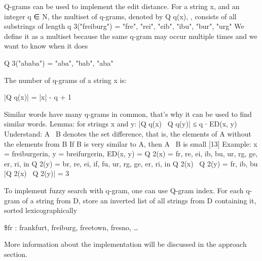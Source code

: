 Q-grams can be used to implement the edit distance. For a string x, and an integer q ∈ N, the multiset of q-grams, denoted by Q q(x), , consists of all substrings of length q 3("freiburg") = { "fre", "rei", "eib", "ibu", "bur", "urg" } \cite{freiburg2023ir}
We define it as a multiset because the same q-gram may occur multiple times and we want to know when it does 

Q 3("ababa") = { "aba", "bab", "aba" }

The number of q-grams of a string x is:

|Q q(x)| = |x| - q + 1

Similar words have many q-grams in common, that's why it can be used to find similar words. 
Lemma: for strings x and y: |Q q(x) \ Q q(y)| ≤ q ∙ ED(x, y)
Understand: A \ B denotes the set difference, that is, the elements of A without the elements from B If B is very similar to A, then A \ B is small [13]
Example:
x = freiburgerin, y = breifurgerin, ED(x, y) = Q 2(x) = { fr, re, ei, ib, bu, ur, rg, ge, er, ri, in } Q 2(y) = { br, re, ei, if, fu, ur, rg, ge, er, ri, in } 
Q 2(x) \ Q 2(y) = {fr, ib, bu}
|Q 2(x) \ Q 2(y)| = 3

To implement fuzzy search with q-gram, one can use Q-gram index. For each q-gram of a string from D, store an inverted list of all strings from D containing it, sorted lexicographically

\$fr : frankfurt, freiburg, freetown, fresno, …

More information about the implementation will be discussed in the approach section.
